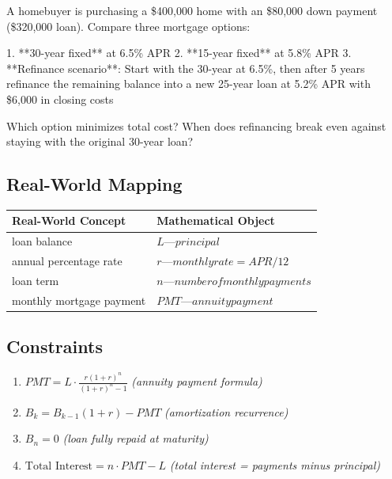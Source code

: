 \documentclass[11pt, a4paper]{article}
\begin{document}
A homebuyer is purchasing a \$400,000 home with an \$80,000 down payment (\$320,000 loan). Compare three mortgage options:

1. **30-year fixed** at 6.5\% APR
2. **15-year fixed** at 5.8\% APR
3. **Refinance scenario**: Start with the 30-year at 6.5\%, then after 5 years refinance the remaining balance into a new 25-year loan at 5.2\% APR with \$6,000 in closing costs

Which option minimizes total cost? When does refinancing break even against staying with the original 30-year loan?

\subsection{Real-World Mapping}

\begin{longtable}{ll}
\toprule
\textbf{Real-World Concept} & \textbf{Mathematical Object} \\
\midrule
\endhead
loan balance & $L — principal$ \\
annual percentage rate & $r — monthly rate = APR/12$ \\
loan term & $n — number of monthly payments$ \\
monthly mortgage payment & $PMT — annuity payment$ \\
\bottomrule
\end{longtable}

\subsection{Constraints}

\begin{enumerate}
  \item $PMT = L \cdot \frac{r(1+r)^n}{(1+r)^n - 1}$
  \hfill \textit{(annuity payment formula)}
  \item $B_k = B_{k-1}(1+r) - PMT$
  \hfill \textit{(amortization recurrence)}
  \item $B_n = 0$
  \hfill \textit{(loan fully repaid at maturity)}
  \item $\text{Total Interest} = n \cdot PMT - L$
  \hfill \textit{(total interest = payments minus principal)}
\end{enumerate}

\end{document}
